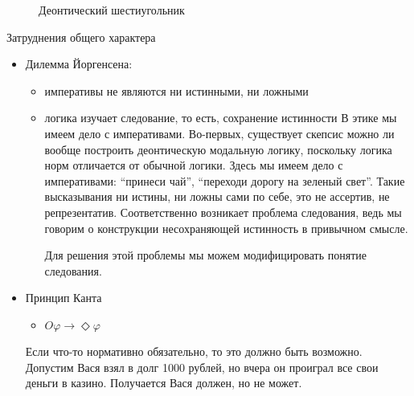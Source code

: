 \documentclass[openany]{book}
\theoremstyle{plain}
\theoremstyle{definition}
\begin{document}
\begin{figure}
    \centering
    \caption{Деонтический шестиугольник}
\end{figure}

Затруднения общего характера 
\begin{itemize}
    \item Дилемма Йоргенсена:
	\begin{itemize}
	    \item императивы не являются ни истинными, ни ложными
	    \item логика изучает следование, то есть, сохранение истинности
		В этике мы имеем дело с императивами. Во-первых, существует скепсис можно ли вообще построить деонтическую модальную логику, поскольку логика норм отличается от обычной логики. Здесь мы имеем дело с императивами: ``принеси чай'', ``переходи дорогу на зеленый свет''. Такие высказывания ни истины, ни ложны сами по себе, это не ассертив, не репрезентатив. Соответственно возникает проблема следования, ведь мы говорим о конструкции несохраняющей истинность в привычном смысле. 

		Для решения этой проблемы мы можем модифицировать понятие следования.
	\end{itemize}
    \item Принцип Канта
	\begin{itemize}
	    \item \(O \varphi \to \Diamond \varphi\)
	\end{itemize}
	Если что-то нормативно обязательно, то это должно быть возможно. Допустим Вася взял в долг 1000 рублей, но вчера он проиграл все свои деньги в казино. Получается Вася должен, но не может.
\end{itemize}
\end{document}
